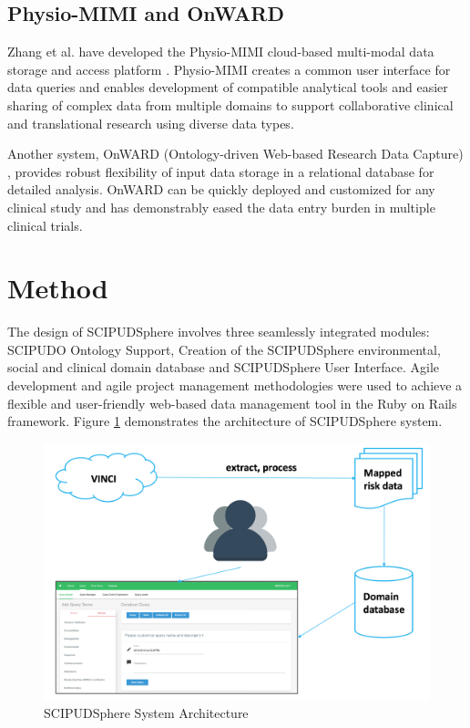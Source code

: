\documentclass{amia}
\begin{document}
\subsection{Physio-MIMI and OnWARD}
Zhang et al. have developed the Physio-MIMI cloud-based multi-modal data storage and access platform \cite{physiomimi}. Physio-MIMI creates a common user interface for data queries and enables development of compatible analytical tools and easier sharing of complex data from multiple domains to support collaborative clinical and translational research using diverse data types. 

Another system, OnWARD (Ontology-driven Web-based Research Data Capture) \cite{onward}, provides robust flexibility of input data storage in a relational database for detailed analysis. OnWARD can be quickly deployed and customized for any clinical study and has demonstrably eased the data entry burden in multiple clinical trials. 

\section{Method}
The design of SCIPUDSphere involves three seamlessly integrated modules: SCIPUDO Ontology Support, Creation of the SCIPUDSphere environmental, social and clinical domain database and SCIPUDSphere User Interface. Agile development and agile project management methodologies were used to achieve a flexible and user-friendly web-based data management tool in the Ruby on Rails framework. Figure \ref{architecture} demonstrates the architecture of SCIPUDSphere system. 

\begin{figure}[h!]
  \centering
  \includegraphics[scale=0.4]{pics/architecture.png}
  \caption{SCIPUDSphere System Architecture}
  \label{architecture}
\end{figure}
\end{document}
